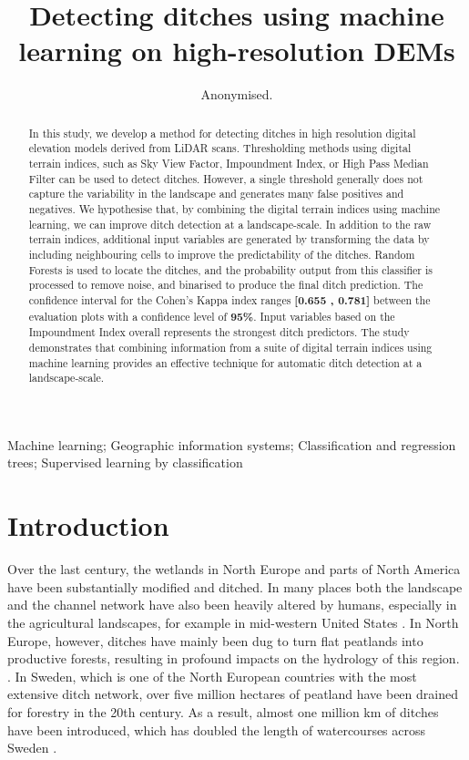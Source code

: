 \documentclass[]{interact}
\theoremstyle{plain}%
\theoremstyle{definition}
\theoremstyle{remark}
\begin{document}
\title{Detecting ditches using machine learning on high-resolution DEMs}

\author{Anonymised.}

\maketitle

\begin{abstract}
In this study, we develop a method for detecting ditches in high resolution digital elevation models derived from LiDAR scans. Thresholding methods using digital terrain indices, such as Sky View Factor, Impoundment Index, or High Pass Median Filter can be used to detect ditches. However, a single threshold generally does not capture the variability in the landscape and generates many false positives and negatives. We hypothesise that, by combining the digital terrain indices using machine learning, we can improve ditch detection at a landscape-scale. In addition to the raw terrain indices, additional input variables are generated by transforming the data by including neighbouring cells to improve the predictability of the ditches. Random Forests is used to locate the ditches, and the probability output from this classifier is processed to remove noise, and binarised to produce the final ditch prediction. The confidence interval for the Cohen's Kappa index ranges \textbf{[0.655 , 0.781]} between the evaluation plots with a confidence level of \textbf{95\%}. Input variables based on the Impoundment Index overall represents the strongest ditch predictors. The study demonstrates that combining information from  a suite of digital terrain indices using machine learning provides an effective technique for automatic ditch detection at a landscape-scale.
\end{abstract}

\begin{keywords}
Machine learning; Geographic information systems; Classification and regression trees; Supervised learning by classification
\end{keywords}


\section{Introduction} \label{introduction}

Over the last century, the wetlands in North Europe and parts of North America have been substantially modified and ditched. In many places both the landscape and the channel network have also been heavily altered  by humans, especially in the agricultural landscapes, for example in mid-western United States \citep{passalacqua}. In North Europe, however, ditches have mainly been dug to turn flat peatlands into productive forests, resulting in profound impacts on the hydrology of this region. \citep{peatlands}. In Sweden, which is one of the North European countries with the most extensive ditch network, over five million hectares of peatland have been drained for forestry in the 20th century.  As a result, almost one million km of ditches have been introduced, which has doubled the length of watercourses across Sweden  \citep{hasselquist}.
\end{document}
